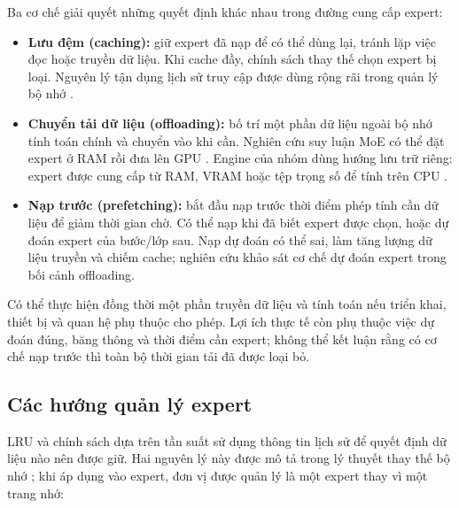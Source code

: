 Ba cơ chế giải quyết những quyết định khác nhau trong đường cung cấp expert:

\begin{itemize}
\item \textbf{Lưu đệm (caching):} giữ expert đã nạp để có thể dùng lại, tránh lặp việc đọc hoặc truyền dữ liệu. Khi cache đầy, chính sách thay thế chọn expert bị loại. Nguyên lý tận dụng lịch sử truy cập được dùng rộng rãi trong quản lý bộ nhớ \cite{ostep_policies}.
\item \textbf{Chuyển tải dữ liệu (offloading):} bố trí một phần dữ liệu ngoài bộ nhớ tính toán chính và chuyển vào khi cần. Nghiên cứu suy luận MoE có thể đặt expert ở RAM rồi đưa lên GPU \cite{moe_offloading}. Engine của nhóm dùng hướng lưu trữ riêng: expert được cung cấp từ RAM, VRAM hoặc tệp trọng số để tính trên CPU \cite{moe_tierengine_arch}.
\item \textbf{Nạp trước (prefetching):} bắt đầu nạp trước thời điểm phép tính cần dữ liệu để giảm thời gian chờ. Có thể nạp khi đã biết expert được chọn, hoặc dự đoán expert của bước/lớp sau. Nạp dự đoán có thể sai, làm tăng lượng dữ liệu truyền và chiếm cache; nghiên cứu \cite{moe_offloading} khảo sát cơ chế dự đoán expert trong bối cảnh offloading.
\end{itemize}

Có thể thực hiện đồng thời một phần truyền dữ liệu và tính toán nếu triển khai, thiết bị và quan hệ phụ thuộc cho phép. Lợi ích thực tế còn phụ thuộc việc dự đoán đúng, băng thông và thời điểm cần expert; không thể kết luận rằng có cơ chế nạp trước thì toàn bộ thời gian tải đã được loại bỏ.

\subsection{Các hướng quản lý expert}

LRU và chính sách dựa trên tần suất sử dụng thông tin lịch sử để quyết định dữ liệu nào nên được giữ. Hai nguyên lý này được mô tả trong lý thuyết thay thế bộ nhớ \cite{ostep_policies}; khi áp dụng vào expert, đơn vị được quản lý là một expert thay vì một trang nhớ:

